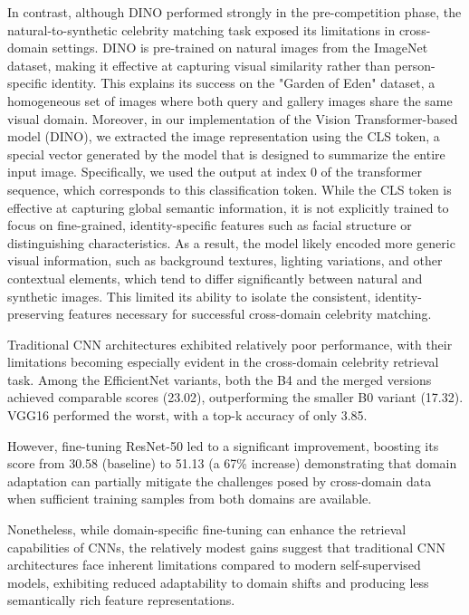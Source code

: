 In contrast, although DINO performed strongly in the pre-competition phase, the natural-to-synthetic celebrity matching task exposed its limitations in cross-domain settings.
DINO is pre-trained on natural images from the ImageNet dataset, making it effective at capturing visual similarity rather than person-specific identity. This explains its success on the "Garden of Eden" dataset, a homogeneous set of images where both query and gallery images share the same visual domain.
Moreover, in our implementation of the Vision Transformer-based model (DINO), we extracted the image representation using the CLS token, a special vector generated by the model that is designed to summarize the entire input image. 
Specifically, we used the output at index 0 of the transformer sequence, which corresponds to this classification token.
While the CLS token is effective at capturing global semantic information, it is not explicitly trained to focus on fine-grained, identity-specific features such as facial structure or distinguishing characteristics.
As a result, the model likely encoded more generic visual information, such as background textures, lighting variations, and other contextual elements, which tend to differ significantly between natural and synthetic images.
This limited its ability to isolate the consistent, identity-preserving features necessary for successful cross-domain celebrity matching.

Traditional CNN architectures exhibited relatively poor performance, with their limitations becoming especially evident in the cross-domain celebrity retrieval task. Among the EfficientNet variants, both the B4 and the merged versions achieved comparable scores (23.02), outperforming the smaller B0 variant (17.32). VGG16 performed the worst, with a top-k accuracy of only 3.85.

However, fine-tuning ResNet-50 led to a significant improvement, boosting its score from 30.58 (baseline) to 51.13 (a 67\% increase) demonstrating that domain adaptation can partially mitigate the challenges posed by cross-domain data when sufficient training samples from both domains are available.

Nonetheless, while domain-specific fine-tuning can enhance the retrieval capabilities of CNNs, the relatively modest gains suggest that traditional CNN architectures face inherent limitations compared to modern self-supervised models, exhibiting reduced adaptability to domain shifts and producing less semantically rich feature representations. 


